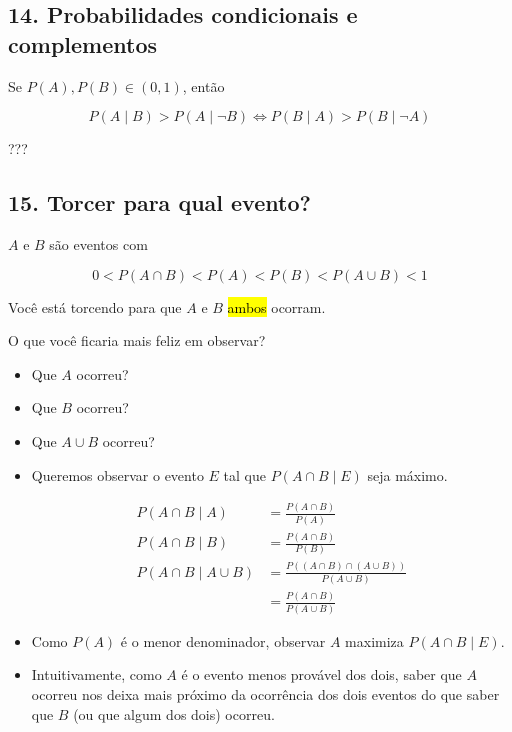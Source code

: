 \documentclass[
  11pt]{report}
\begin{document}
\hypertarget{probabilidades-condicionais-e-complementos}{%
\subsection*{14. Probabilidades condicionais e complementos}\label{probabilidades-condicionais-e-complementos}}

\begin{rmdbox}
Se $P(A), P(B) \in (0, 1)$, então

\[
P(A \mid B) > P(A \mid \neg B) \iff
P(B \mid A) > P(B \mid \neg A)
\]

\end{rmdbox}

???

\hypertarget{torcer-para-qual-evento}{%
\subsection*{15. Torcer para qual evento?}\label{torcer-para-qual-evento}}

\begin{rmdbox}

$A$ e $B$ são eventos com

\[
0 < P(A \cap B) < P(A) < P(B) < P(A \cup B) < 1
\]

Você está torcendo para que $A$ e $B$ {\hl{ambos}} ocorram.

O que você ficaria mais feliz em observar?

\begin{itemize}
\item
  Que $A$ ocorreu?
\item
  Que $B$ ocorreu?
\item
  Que $A \cup B$ ocorreu?
\end{itemize}

\end{rmdbox}

\begin{itemize}
\item
  Queremos observar o evento $E$ tal que $P(A \cap B \mid E)$ seja máximo.

  \[
  \begin{aligned}
  P(A \cap B \mid A) &= \frac{P(A \cap B)}{P(A)} \\
  P(A \cap B \mid B) &= \frac{P(A \cap B)}{P(B)} \\
  P(A \cap B \mid A \cup B) &= 
    \frac{P((A \cap B) \cap (A \cup B))}{P(A \cup B)} \\
    &= \frac{P(A \cap B)}{P(A \cup B)}
  \end{aligned}
  \]
\item
  Como $P(A)$ é o menor denominador, observar $A$ maximiza $P(A \cap B \mid E)$.
\item
  Intuitivamente, como $A$ é o evento menos provável dos dois, saber que $A$ ocorreu nos deixa mais próximo da ocorrência dos dois eventos do que saber que $B$ (ou que algum dos dois) ocorreu.
\end{itemize}
\end{document}
